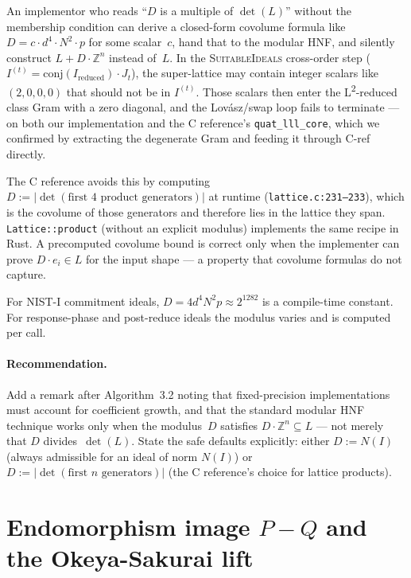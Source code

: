 \documentclass[a4paper,11pt]{article}
\newcommand{\algo}[1]{Algorithm~#1}
\begin{document}
An implementor who reads ``$D$ is a multiple of $\det(L)$''
without the membership condition can derive a closed-form
covolume formula like $D = c \cdot d^4 \cdot N^2 \cdot p$ for
some scalar~$c$, hand that to the modular HNF, and silently
construct $L + D\cdot\mathbb{Z}^n$ instead of~$L$.  In the
\textsc{SuitableIdeals} cross-order step
($I^{(t)} = \mathrm{conj}(I_{\mathrm{reduced}}) \cdot J_t$), the
super-lattice may contain integer scalars like $(2, 0, 0, 0)$
that should not be in $I^{(t)}$.  Those scalars then enter the
L\textsuperscript{2}-reduced class Gram with a zero
diagonal, and the Lov\'asz/swap loop fails to terminate --- on
both our implementation and the C reference's
\texttt{quat\_lll\_core}, which we confirmed by extracting the
degenerate Gram and feeding it through C-ref directly.

The C reference avoids this by computing
$D := |\det(\text{first 4 product generators})|$ at runtime
(\texttt{lattice.c:231--233}), which is the covolume of those
generators and therefore lies in the lattice they span.
\texttt{Lattice::product} (without an explicit modulus)
implements the same recipe in Rust.  A precomputed covolume
bound is correct only when the implementer can prove
$D \cdot e_i \in L$ for the input shape --- a property that
covolume formulas do not capture.

For NIST-I commitment ideals, $D = 4 d^4 N^2 p \approx 2^{1282}$
is a compile-time constant.  For response-phase and post-reduce
ideals the modulus varies and is computed per call.

\paragraph{Recommendation.}
Add a remark after \algo{3.2} noting that fixed-precision
implementations must account for coefficient growth, and that the
standard modular HNF technique works only when the modulus~$D$
satisfies $D \cdot \mathbb{Z}^n \subseteq L$ --- not merely that
$D$ divides~$\det(L)$.  State the safe defaults explicitly:
either $D := N(I)$ (always admissible for an ideal of norm $N(I)$)
or $D := |\det(\text{first }n\text{ generators})|$ (the C
reference's choice for lattice products).

\section{Endomorphism image $P{-}Q$ and the Okeya-Sakurai lift}
\label{sec:endo-pmq}
\end{document}
